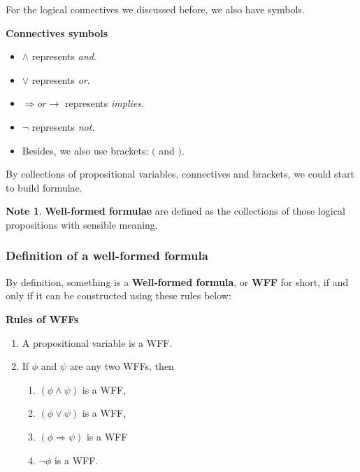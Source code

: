 \documentclass[11pt]{article}
\theoremstyle{definition}
\newtheorem{note}{Note}[subsection]
\begin{document}
For the logical connectives we discussed before, we also have symbols.
\begin{shaded}
\textbf{Connectives symbols}
\begin{itemize}
    \item $\wedge$ represents \textit{and}.
    \item $\vee$ represents \textit{or}.
    \item $\Rightarrow or \rightarrow$ represents \textit{implies}.
    \item $\neg$ represents \textit{not}.
    \item Besides, we also use brackets: $($ and $)$.
\end{itemize}    
\end{shaded}
By collections of propositional variables, connectives and brackets, we could start to build formulae.
\begin{note}
    \textbf{Well-formed formulae} are defined as the collections of those logical propositions with sensible meaning.
\end{note}

\subsubsection{Definition of a well-formed formula}
By definition, something is a \textbf{Well-formed formula}, or \textbf{WFF} for short, if and only if it can be constructed using these rules below:
\begin{shaded}
\textbf{Rules of WFFs}
\begin{enumerate}
    \item A propositional variable is a WFF.
    \item If $\phi$ and $\psi$ are any two WFFs, then
        \begin{enumerate}
            \item $(\phi \wedge \psi)$ is a WFF,
            \item $(\phi \vee \psi)$ is a WFF,
            \item $(\phi \Rightarrow \psi)$ is a WFF
            \item $\neg \phi$ is a WFF.
        \end{enumerate}
\end{enumerate}
\end{shaded}
\end{document}
